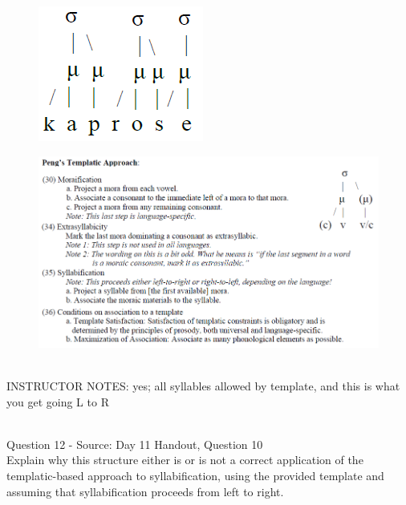 \documentclass[12pt]{article}
\begin{document}
\begin{figure}[H]
\includegraphics{../images/pengtemplate_kaprosse_yes.png}
\end{figure}
\begin{figure}[H]
\includegraphics{../images/peng_template_withdiagram.png}
\end{figure}

~\\
INSTRUCTOR NOTES: yes; all syllables allowed by template, and this is what you get going L to R


~\\

{\large Question 12} - Source: Day 11 Handout, Question 10\\

Explain why this structure either is or is not a correct application of the templatic-based approach to syllabification, using the provided template and assuming that syllabification proceeds from left to right.\\
\end{document}
